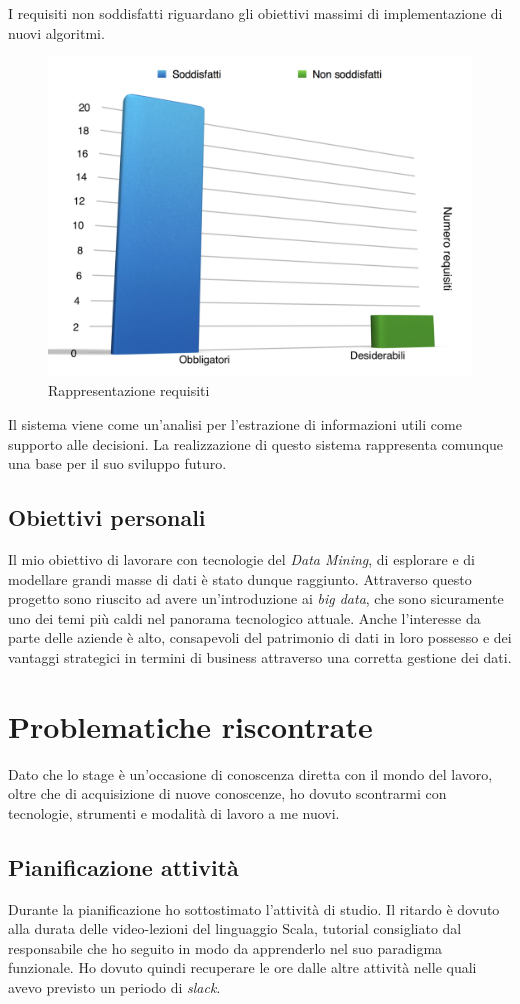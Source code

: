  I requisiti non soddisfatti riguardano gli obiettivi massimi di implementazione di nuovi algoritmi.
 
 
\begin{figure}[h]
\centering
\includegraphics[width=0.7\linewidth]{immagini/chartReq}
\caption[Rappresentazione requisiti]{Rappresentazione requisiti}
\label{fig:chartReq}
\end{figure}

\newpage
Il sistema viene come un'analisi per l'estrazione di informazioni utili come supporto alle decisioni. La realizzazione di questo sistema  rappresenta comunque una base per il suo sviluppo futuro.

\subsection{Obiettivi personali} 
Il mio obiettivo di lavorare con tecnologie del \textit{Data Mining}, di esplorare e di modellare grandi masse di dati è stato dunque raggiunto. Attraverso questo progetto sono riuscito ad avere un'introduzione ai \textit{big data}, che sono sicuramente uno dei temi più caldi nel panorama tecnologico attuale. Anche l'interesse da parte delle aziende è alto, consapevoli del patrimonio di dati in loro possesso e dei vantaggi strategici in termini di business attraverso una corretta gestione dei dati. \\


\section{Problematiche riscontrate}
Dato che lo stage è un'occasione di conoscenza diretta con il mondo del lavoro, oltre che di acquisizione di nuove conoscenze, ho dovuto scontrarmi con tecnologie, strumenti e modalità di lavoro a me nuovi. 
\subsection*{Pianificazione attività}
Durante la pianificazione ho sottostimato l'attività di studio. Il ritardo è dovuto alla durata delle video-lezioni del linguaggio Scala, tutorial consigliato dal responsabile che ho seguito in modo da apprenderlo nel suo paradigma funzionale. Ho dovuto quindi recuperare le ore dalle altre attività nelle quali avevo previsto un periodo di \textit{slack}.

